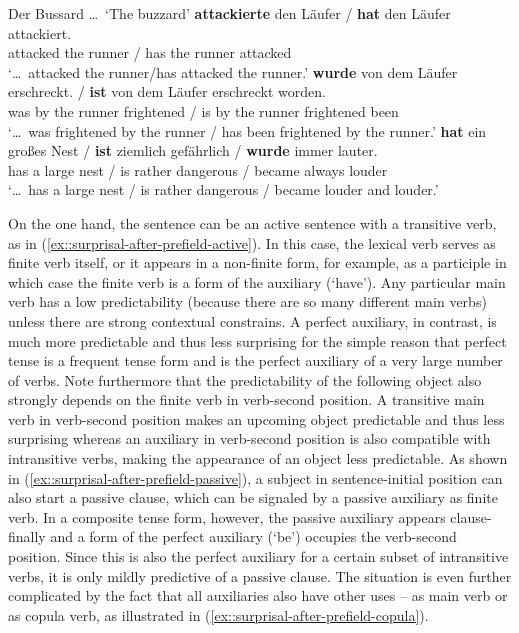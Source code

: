 \documentclass[output=paper,colorlinks,citecolor=brown]{langscibook}
\begin{document}
\newpage

\ea\label{ex:surprisal-after-prefield} 
    Der Bussard \ldots\ \enquote*{The buzzard}
    \ea \gll {\ldots} \textbf{attackierte} den Läufer / \textbf{hat} den Läufer attackiert.\\
        {} attacked the runner / has the runner attacked\\
    \glt \enquote*{\ldots\ attacked the runner/has attacked the runner.}\label{ex::surprisal-after-prefield-active}
    \ex \gll {\ldots} \textbf{wurde} von dem Läufer erschreckt. / \textbf{ist} von dem Läufer erschreckt worden.\\
        {} was by the runner frightened / is by the runner frightened been\\
    \glt \enquote*{\ldots\ was frightened by the runner / has been frightened by the runner.}\label{ex::surprisal-after-prefield-passive}
    \ex \gll {\ldots} \textbf{hat} ein großes Nest / \textbf{ist} ziemlich gefährlich / \textbf{wurde} immer lauter.\\
        {} has a large nest / is rather dangerous / became always louder\\
    \glt \enquote*{\ldots\ has a large nest / is rather dangerous / became louder and louder.}\label{ex::surprisal-after-prefield-copula}
\z\z

On the one hand, the sentence can be an active sentence with a transitive verb, as in (\ref{ex::surprisal-after-prefield-active}). In this case, the lexical verb serves as finite verb itself, or it appears in a non-finite form, for example, as a participle in which case the finite verb is a form of the auxiliary  (\enquote*{have}). Any particular main verb has a low predictability (because there are so many different main verbs) unless there are strong contextual constrains. A perfect auxiliary, in contrast, is much more predictable and thus less surprising for the simple reason that perfect tense is a frequent tense form and  is the perfect auxiliary of a very large number of verbs. Note furthermore that the predictability of the following object also strongly depends on the finite verb in verb-second position. A transitive main verb in verb-second position makes an upcoming object predictable and thus less surprising whereas an auxiliary in verb-second position is also compatible with intransitive verbs, making the appearance of an object less predictable. As shown in (\ref{ex::surprisal-after-prefield-passive}), a subject in sentence-initial position can also start a passive clause, which can be signaled by a passive auxiliary as finite verb. In a composite tense form, however, the passive auxiliary appears clause-finally and a form of the perfect auxiliary  (\enquote*{be}) occupies the verb-second position. Since this is also the perfect auxiliary for a certain subset of intransitive verbs, it is only mildly predictive of a passive clause. The situation is even further complicated by the fact that all auxiliaries also have other uses -- as main verb or as copula verb, as illustrated in (\ref{ex::surprisal-after-prefield-copula}). 
\end{document}
